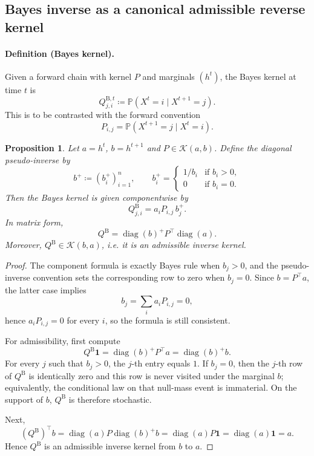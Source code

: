 \documentclass[11pt]{article}
\newcommand{\ones}{\mathbf{1}}
\newcommand{\diag}{\operatorname{diag}}
\newcommand{\Kset}{\mathcal{K}}
\newtheorem{proposition}{Proposition}
\begin{document}
\subsection{Bayes inverse as a canonical admissible reverse kernel}
\paragraph{Definition (Bayes kernel).}
Given a forward chain with kernel $P$ and marginals $(h^t)$, the Bayes kernel at time $t$ is
\[
Q^{\mathrm B,t}_{j,i}\coloneqq
\mathbb{P}(X^t=i\mid X^{t+1}=j).
\]
This is to be contrasted with the forward convention
\[
P_{i,j}=\mathbb P(X^{t+1}=j\mid X^t=i).
\]

\begin{proposition}
Let $a=h^t$, $b=h^{t+1}$ and $P\in\Kset(a,b)$. Define the diagonal pseudo-inverse by
\[
b^+\coloneqq (b_i^+)_{i=1}^n,
\qquad
b_i^+=
\begin{cases}
1/b_i & \text{if } b_i>0,\\
0 & \text{if } b_i=0.
\end{cases}
\]
Then the Bayes kernel is given componentwise by
\begin{equation}
\label{eq:bayes-entry}
Q^{\mathrm B}_{j,i}=a_i P_{i,j}\, b_j^+.
\end{equation}
In matrix form,
\begin{equation}
\label{eq:bayes-diag}
Q^{\mathrm B}=\diag(b)^+P^\top\diag(a).
\end{equation}
Moreover, $Q^{\mathrm B}\in\Kset(b,a)$, i.e. it is an admissible inverse kernel.
\end{proposition}
\begin{proof}
The component formula is exactly Bayes rule when $b_j>0$, and the pseudo-inverse convention sets the corresponding row to zero when $b_j=0$. Since $b=P^\top a$, the latter case implies
\[
b_j=\sum_i a_i P_{i,j}=0,
\]
hence $a_i P_{i,j}=0$ for every $i$, so the formula is still consistent.

For admissibility, first compute
\[
Q^{\mathrm B}\ones
=
\diag(b)^+P^\top a
=
\diag(b)^+ b.
\]
For every $j$ such that $b_j>0$, the $j$-th entry equals $1$. If $b_j=0$, then the $j$-th row of $Q^{\mathrm B}$ is identically zero and this row is never visited under the marginal $b$; equivalently, the conditional law on that null-mass event is immaterial. On the support of $b$, $Q^{\mathrm B}$ is therefore stochastic.

Next,
\[
(Q^{\mathrm B})^\top b
=
\diag(a)P\diag(b)^+ b
=
\diag(a)P\mathbf 1
=
\diag(a)\mathbf 1
=
a.
\]
Hence $Q^{\mathrm B}$ is an admissible inverse kernel from $b$ to $a$.
\end{proof}
\end{document}
